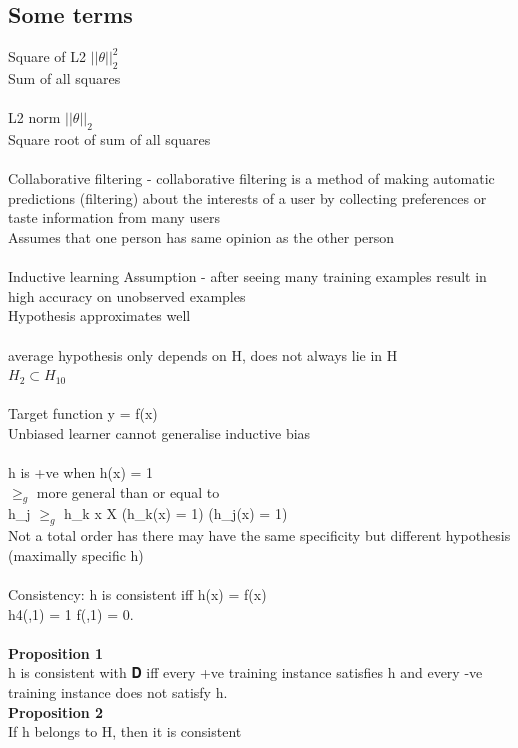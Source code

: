 \documentclass[11pt]{article}
\begin{document}
\noindent
\subsection*{Some terms}
Square of L2 $||\theta ||^{2}_{2}$\\
Sum of all squares
\\\\
L2 norm $||\theta ||_{2}$\\
Square root of sum of all squares
\\
\\
Collaborative filtering - collaborative filtering is a method of making automatic predictions (filtering) about the interests of a user by collecting preferences or taste information from many users\\
Assumes that one person has same opinion as the other person
\\\\
Inductive learning Assumption - after seeing many training examples result in high accuracy on unobserved examples\\
Hypothesis approximates well\\
\\
average hypothesis only depends on H, does not always lie in H\\
$H_{2} \subset H_{10}$\\
\\
Target function y = f(x)\\
Unbiased learner cannot generalise \rightarrow\) inductive bias
\\\\
h is +ve when h(x) = 1\\
$\geq_{g}$ more general than	 or equal to\\
h_{j} $\geq_{g}$ h_{k} \equiv \forall x \in X (h_{k}(x) = 1) \rightarrow (h_{j}(x) = 1)\)
\\
Not a total order has there may have the same specificity but different hypothesis (maximally specific h)
\\
\\
Consistency: h is consistent iff h(x) = f(x)\\
 h4(,1\rangle) = 1 \neq f(,1\rangle) = 0.\\\\
 \textbf{Proposition 1} \\
\)h is consistent with 𝐃 iff every +ve training instance satisfies h and every
-ve training instance does not satisfy h.\\
 \textbf{Proposition 2} \\
\)If h belongs to H, then it is consistent
\end{document}
